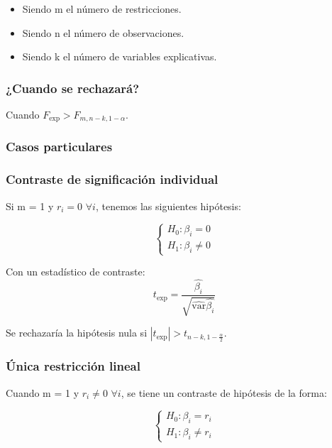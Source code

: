 \documentclass[a4paper,12pt]{article}
\newcommand{\ecuacion}[1]{\ensuremath{#1}}
\begin{document}
\begin{itemize}
    \item Siendo m el número de restricciones.
    \item Siendo n el número de observaciones.
    \item Siendo k el número de variables explicativas.
\end{itemize}

\subsubsection*{¿Cuando se rechazará?}
Cuando \ecuacion{F_{\text{exp}} > F_{m,n-k,1-\alpha}}.

\subsubsection{Casos particulares}

\subsubsection*{Contraste de significación individual}

Si m = 1 y $r_i = 0 \,\,\forall i$, tenemos las siguientes hipótesis:

\begin{equation}
    \begin{cases}
        H_0: \beta_i = 0 \\
        H_1: \beta_i \neq 0
    \end{cases}
\end{equation}

Con un estadístico de contraste:
\begin{equation}
    t_{\text{exp}} = \frac{\hat{\beta_i}}{\sqrt{\hat{\text{var}}\hat{\beta_i}}} 
\end{equation}

Se rechazaría la hipótesis nula si \ecuacion{|t_{\text{exp}}| > t_{n-k,1-\frac{\alpha}{2}}}.

\subsubsection*{Única restricción lineal}

Cuando m = 1 y $r_i \neq 0 \,\, \forall i$, se tiene un contraste de hipótesis de la forma:

\begin{equation}
    \begin{cases}
        H_0: \beta_i = r_i \\
        H_1: \beta_i \neq r_i
    \end{cases}
\end{equation}
\end{document}
